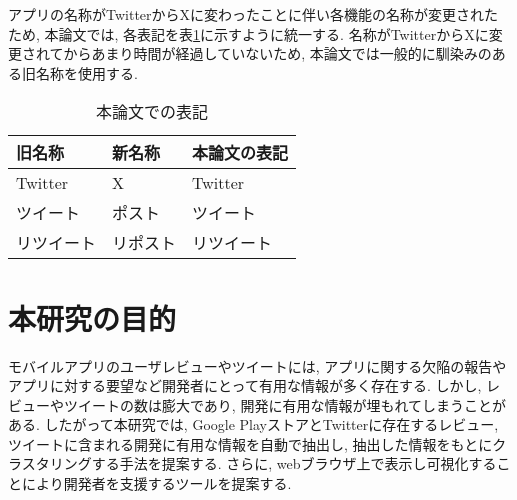 アプリの名称がTwitterからXに変わったことに伴い各機能の名称が変更されたため, 本論文では, 各表記を表\ref{tb:twitter}に示すように統一する. 名称がTwitterからXに変更されてからあまり時間が経過していないため, 本論文では一般的に馴染みのある旧名称を使用する. 

\begin{table}[H]
  \caption{本論文での表記}
  \label{tb:twitter}
  \begin{center}
  \begin{tabularx}{\linewidth}{X|X|X}
    \hline
    旧名称&新名称&本論文の表記\\\hline\hline
    Twitter&X&Twitter\\\hline
    ツイート&ポスト&ツイート\\\hline
    リツイート&リポスト&リツイート\\\hline
  \end{tabularx}\end{center}
\end{table}


\section{本研究の目的}

モバイルアプリのユーザレビューやツイートには, アプリに関する欠陥の報告やアプリに対する要望など開発者にとって有用な情報が多く存在する. しかし, レビューやツイートの数は膨大であり, 開発に有用な情報が埋もれてしまうことがある. 
したがって本研究では, Google PlayストアとTwitterに存在するレビュー, ツイートに含まれる開発に有用な情報を自動で抽出し, 抽出した情報をもとにクラスタリングする手法を提案する. さらに, webブラウザ上で表示し可視化することにより開発者を支援するツールを提案する. 


